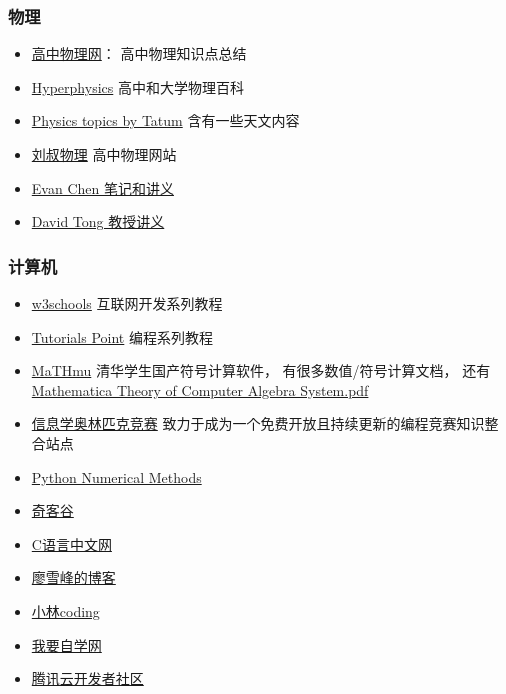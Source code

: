 \subsubsection{物理}
\begin{itemize}
\item \href{http://gaozhongwuli.com}{高中物理网}： 高中物理知识点总结
\item \href{http://hyperphysics.phy-astr.gsu.edu}{Hyperphysics} 高中和大学物理百科
\item \href{http://www.astro.uvic.ca/~tatum/index.php}{Physics topics by Tatum} 含有一些天文内容
\item \href{http://www.myliushu.com}{刘叔物理} 高中物理网站
\item \href{https://web.evanchen.cc/coursework.html}{Evan Chen 笔记和讲义}
\item \href{http://www.damtp.cam.ac.uk/user/tong/teaching.html}{David Tong 教授讲义}
\end{itemize}

\subsubsection{计算机}
\begin{itemize}
\item \href{https://www.w3schools.com}{w3schools} 互联网开发系列教程
\item \href{https://www.tutorialspoint.com/index.htm}{Tutorials Point} 编程系列教程
\item \href{http://mathmu.github.io/MTCAS/RecentChanges.html}{MaTHmu} 清华学生国产符号计算软件， 有很多数值/符号计算文档， 还有 \href{https://github.com/maTHmU/MTCAS}{Mathematica Theory of Computer Algebra System.pdf}
\item \href{https://oi-wiki.org}{信息学奥林匹克竞赛} 致力于成为一个免费开放且持续更新的编程竞赛知识整合站点
\item \href{https://pythonnumericalmethods.berkeley.edu/notebooks/Index.html}{Python Numerical Methods}
\item \href{https://www.qikegu.com}{奇客谷}
\item \href{http://c.biancheng.net}{C语言中文网}
\item \href{https://www.liaoxuefeng.com}{廖雪峰的博客}
\item \href{https://xiaolincoding.com}{小林coding}
\item \href{https://www.51zxw.net}{我要自学网}
\item \href{https://cloud.tencent.com/developer}{腾讯云开发者社区}
\end{itemize}

